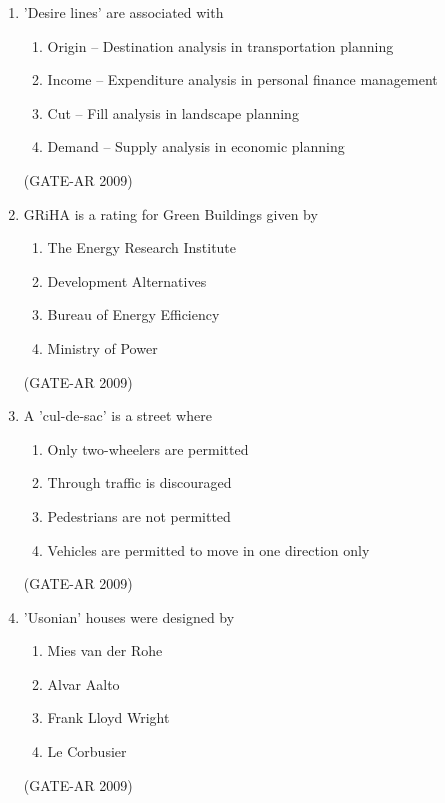 \documentclass[a4paper,10pt]{article}
\begin{document}
\begin{enumerate}
    \item 'Desire lines' are associated with 
    \begin{enumerate}
        \item Origin – Destination analysis in transportation planning
        \item Income – Expenditure analysis in personal finance management
        \item Cut – Fill analysis in landscape planning
        \item Demand – Supply analysis in economic planning
    \end{enumerate}
    \hfill (GATE-AR 2009)

	\item GRiHA is a rating for Green Buildings given by 
    \begin{multicols}{2}
	\begin{enumerate}
        \item The Energy Research Institute
        \item Development Alternatives
        \item Bureau of Energy Efficiency
        \item Ministry of Power
    \end{enumerate}
	\end{multicols}
    \hfill (GATE-AR 2009)
    
    \item A 'cul-de-sac' is a street where 
    \begin{enumerate}
        \item Only two-wheelers are permitted
        \item Through traffic is discouraged
        \item Pedestrians are not permitted
        \item Vehicles are permitted to move in one direction only
    \end{enumerate}
    \hfill (GATE-AR 2009)

    \item 'Usonian' houses were designed by 
    \begin{multicols}{2}
	\begin{enumerate}
        \item Mies van der Rohe
        \item Alvar Aalto
        \item Frank Lloyd Wright
        \item Le Corbusier
    \end{enumerate}
	\end{multicols}
    \hfill (GATE-AR 2009)
    

\end{enumerate}
\end{document}

